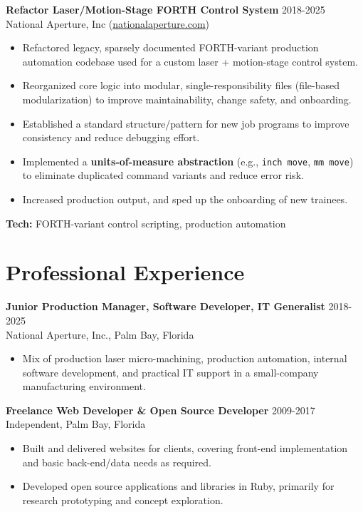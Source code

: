 \documentclass[11pt]{article}
\begin{document}
\vspace{12pt}

\vspace{6pt}
\textbf{Refactor Laser/Motion-Stage FORTH Control System} \hfill 2018-2025\\
National Aperture, Inc (\href{https://nationalaperture.com}{nationalaperture.com})
\vspace{2pt}
\begin{itemize}
  \item Refactored legacy, sparsely documented FORTH-variant production automation codebase used for a custom laser + motion-stage control system.
  \item Reorganized core logic into modular, single-responsibility files (file-based modularization) to improve maintainability, change safety, and onboarding.
  \item Established a standard structure/pattern for new job programs to improve consistency and reduce debugging effort.
  \item Implemented a \textbf{units-of-measure abstraction} (e.g., \texttt{inch move}, \texttt{mm move}) to eliminate duplicated command variants and reduce error risk.
  \item Increased production output, and sped up the onboarding of new trainees. 
\end{itemize}
\vspace{6pt}
\textbf{Tech:} FORTH-variant control scripting, production automation

\vspace{12pt}

\section*{Professional Experience}

\vspace{6pt}
\textbf{Junior Production Manager, Software Developer, IT Generalist} \hfill 2018-2025\\
National Aperture, Inc., Palm Bay, Florida
\vspace{2pt}
\begin{itemize}
  \item Mix of production laser micro-machining, production automation, internal software development, and practical IT support in a small-company manufacturing environment.
\end{itemize}

\vspace{6pt}
\textbf{Freelance Web Developer \& Open Source Developer} \hfill 2009-2017\\
Independent, Palm Bay, Florida
\vspace{2pt}
\begin{itemize}
  \item Built and delivered websites for clients, covering front-end implementation and basic back-end/data needs as required.
  \item Developed open source applications and libraries in Ruby, primarily for research prototyping and concept exploration.
\end{itemize}
\end{document}
